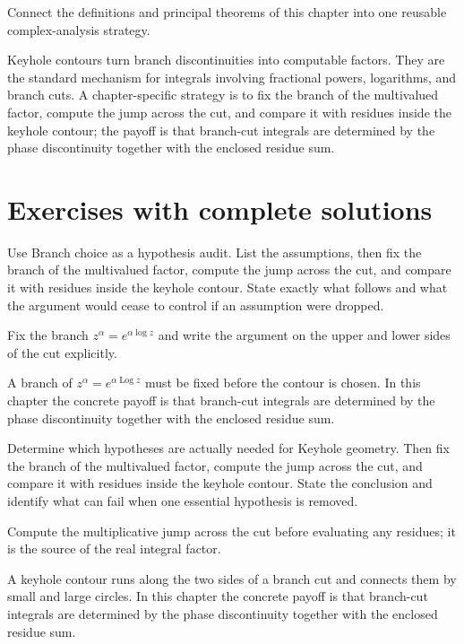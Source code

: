 \begin{problem}\label{prob:iv21-problem-12}
Connect the definitions and principal theorems of this chapter into one reusable complex-analysis strategy.
\end{problem}
\begin{solution}
Keyhole contours turn branch discontinuities into computable factors. They are the standard mechanism for integrals involving fractional powers, logarithms, and branch cuts. A chapter-specific strategy is to fix the branch of the multivalued factor, compute the jump across the cut, and compare it with residues inside the keyhole contour; the payoff is that branch-cut integrals are determined by the phase discontinuity together with the enclosed residue sum.
\end{solution}

\section{Exercises with complete solutions}

\begin{exercise}\label{exr:iv21-01}
Use Branch choice as a hypothesis audit. List the assumptions, then fix the branch of the multivalued factor, compute the jump across the cut, and compare it with residues inside the keyhole contour. State exactly what follows and what the argument would cease to control if an assumption were dropped.
\end{exercise}
\begin{hint}
Fix the branch \(z^\alpha=e^{\alpha\log z}\) and write the argument on the upper and lower sides of the cut explicitly.
\end{hint}
\begin{solution}
A branch of $z^\alpha=e^{\alpha\operatorname{Log} z}$ must be fixed before the contour is chosen. In this chapter the concrete payoff is that branch-cut integrals are determined by the phase discontinuity together with the enclosed residue sum.
\end{solution}

\begin{exercise}\label{exr:iv21-02}
Determine which hypotheses are actually needed for Keyhole geometry. Then fix the branch of the multivalued factor, compute the jump across the cut, and compare it with residues inside the keyhole contour. State the conclusion and identify what can fail when one essential hypothesis is removed.
\end{exercise}
\begin{hint}
Compute the multiplicative jump across the cut before evaluating any residues; it is the source of the real integral factor.
\end{hint}
\begin{solution}
A keyhole contour runs along the two sides of a branch cut and connects them by small and large circles. In this chapter the concrete payoff is that branch-cut integrals are determined by the phase discontinuity together with the enclosed residue sum.
\end{solution}

